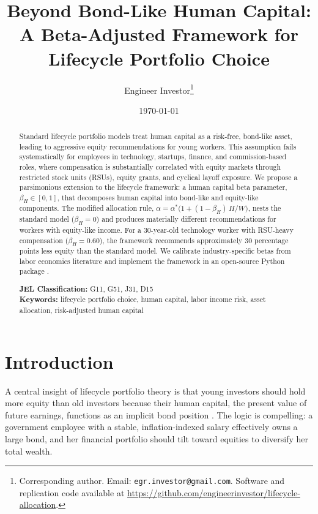 \documentclass[11pt]{article}
\title{Beyond Bond-Like Human Capital:\\
A Beta-Adjusted Framework for Lifecycle Portfolio Choice}
\author{Engineer Investor\thanks{%
Corresponding author. Email: \texttt{egr.investor@gmail.com}.
Software and replication code available at
\url{https://github.com/engineerinvestor/lifecycle-allocation}.}}
\date{\today}
\begin{document}
\maketitle

\begin{abstract}
Standard lifecycle portfolio models treat human capital as a risk-free,
bond-like asset, leading to aggressive equity recommendations for young
workers. This assumption fails systematically for employees in technology,
startups, finance, and commission-based roles, where compensation is
substantially correlated with equity markets through restricted stock units
(RSUs), equity grants, and cyclical layoff exposure. We propose a
parsimonious extension to the \citet{choi2025} lifecycle framework: a human
capital beta parameter, $\beta_H \in [0,1]$, that decomposes human capital
into bond-like and equity-like components. The modified allocation rule,
$\alpha = \alpha^{*}\!\bigl(1 + (1-\beta_H)\,H/W\bigr)$, nests the
standard model ($\beta_H = 0$) and produces materially different
recommendations for workers with equity-like income. For a 30-year-old
technology worker with RSU-heavy compensation ($\beta_H = 0.60$), the
framework recommends approximately 30 percentage points less equity than
the standard model. We calibrate industry-specific betas from labor
economics literature and implement the framework in an open-source Python
package \citep{lifecycle_allocation}.

\medskip
\noindent\textbf{JEL Classification:} G11, G51, J31, D15\\
\textbf{Keywords:} lifecycle portfolio choice, human capital, labor income
risk, asset allocation, risk-adjusted human capital
\end{abstract}

\newpage

\section{Introduction}\label{sec:intro}

A central insight of lifecycle portfolio theory is that young investors
should hold more equity than old investors because their human capital, the
present value of future earnings, functions as an implicit bond position
\citep{merton1969, bodie1992}. The logic is compelling: a government
employee with a stable, inflation-indexed salary effectively owns a large
bond, and her financial portfolio should tilt toward equities to diversify
her total wealth.
\end{document}
